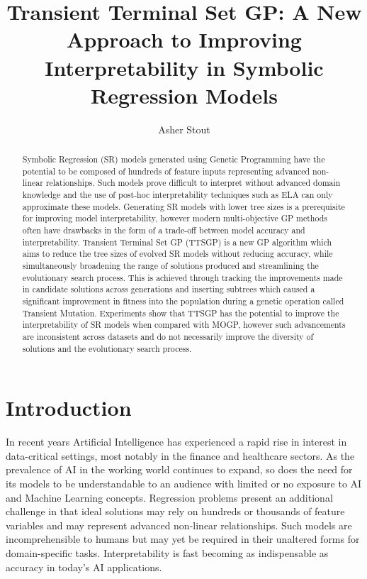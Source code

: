 \documentclass[a4paper, twocolumn]{article}
\title{Transient Terminal Set GP: A New Approach to Improving Interpretability in Symbolic Regression Models}
\author{Asher Stout}
\begin{document}
\maketitle
\begin{abstract}
Symbolic Regression (SR) models generated using Genetic Programming have the potential to be composed of hundreds of feature inputs representing advanced non-linear relationships. Such models prove difficult to interpret without advanced domain knowledge and the use of post-hoc interpretability techniques such as ELA can only approximate these models. Generating SR models with lower tree sizes is a prerequisite for improving model interpretability, however modern multi-objective GP methods often have drawbacks in the form of a trade-off between model accuracy and interpretability. Transient Terminal Set GP (TTSGP) is a new GP algorithm which aims to reduce the tree sizes of evolved SR models without reducing accuracy, while simultaneously broadening the range of solutions produced and streamlining the evolutionary search process. This is achieved through tracking the improvements made in candidate solutions across generations and inserting subtrees which caused a significant improvement in fitness into the population during a genetic operation called Transient Mutation. Experiments show that TTSGP has the potential to improve the interpretability of SR models when compared with MOGP, however such advancements are inconsistent across datasets and do not necessarily improve the diversity of solutions and the evolutionary search process.
\end{abstract}

\section{Introduction}
In recent years Artificial Intelligence has experienced a rapid rise in interest in data-critical settings, most notably in the finance and healthcare sectors. As the prevalence of AI in the working world continues to expand, so does the need for its models to be understandable to an audience with limited or no exposure to AI and Machine Learning concepts. Regression problems present an additional challenge in that ideal solutions may rely on hundreds or thousands of feature variables and may represent advanced non-linear relationships. Such models are incomprehensible to humans but may yet be required in their unaltered forms for domain-specific tasks. Interpretability is fast becoming as indispensable as accuracy in today's AI applications.
\end{document}
